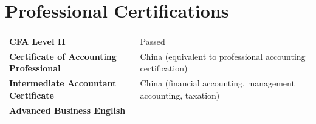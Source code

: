\section{Professional Certifications}
\begin{tabularx}{\linewidth}{@{}l X@{}}
\textbf{CFA Level II} & Passed \\
\textbf{Certificate of Accounting Professional} & China (equivalent to professional accounting certification) \\
\textbf{Intermediate Accountant Certificate} & China (financial accounting, management accounting, taxation) \\
\textbf{Advanced Business English} & \\
\end{tabularx}
